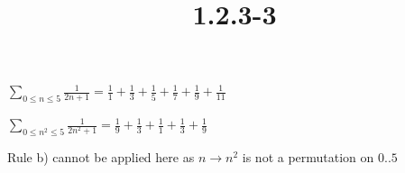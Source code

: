 \documentclass{article}
\title{1.2.3-3}
\begin{document}
\maketitle

$\sum_{0\leq n \leq 5}\frac{1}{2n+1} = \frac{1}{1} + \frac{1}{3} + \frac{1}{5} + \frac{1}{7} + \frac{1}{9} + \frac{1}{11}$

$\sum_{0\leq n^2 \leq 5}\frac{1}{2n^2+1} = \frac{1}{9} + \frac{1}{3} + \frac{1}{1} + \frac{1}{3} + \frac{1}{9}$

Rule b) cannot be applied here as $n \to n^2$ is not a permutation on $0..5$
\end{document}
